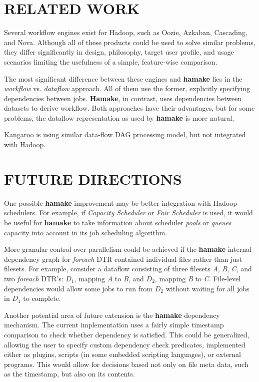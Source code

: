 \documentclass[a4paper,twoside]{article}
\begin{document}
\section{\uppercase{Related Work}}

Several workflow engines exist for Hadoop, such as Oozie\cite{ooize},
Azkaban\cite{azkaban}, Cascading\cite{cascading}, and
Nova\cite{olston2011nova}.  Although all of these products could be
used to solve similar problems, they differ significantly in design,
philosophy, target user profile, and usage scenarios limiting the
usefulness of a simple, feature-wise comparison.

The most significant difference between these engines and
\textbf{hamake} lies in the \textit{workflow} vs. \textit{dataflow}
approach. All of them use the former, explicitly specifying
dependencies between jobs. \textbf{Hamake}, in contrast, uses
dependencies between datasets to derive workflow. Both approaches have
their advantages, but for some problems, the dataflow representation
as used by \textbf{hamake} is more natural.

Kangaroo\cite{zhang2011kangaroo} is using similar data-flow DAG
processing model, but not integrated with Hadoop.

\section{\uppercase{Future Directions}}

One possible \textbf{hamake} improvement may be better integration with Hadoop schedulers. For example, if \textit{Capacity Scheduler} or \textit{Fair Scheduler} is used, it would be useful for \textbf{hamake} to take information about scheduler \textit{pools} or \textit{queues} capacity into account in its job scheduling algorithm.

More granular control over parallelism could be achieved if the
\textbf{hamake} internal dependency graph for \emph{foreach} DTR
contained individual files rather than just filesets. For example, consider a
dataflow consisting of three filesets \textit{A}, \textit{B},
\textit{C}, and two \emph{foreach} DTR's: \textit{$D_1$}, mapping
\textit{A} to \textit{B}, and \textit{$D_2$}, mapping \textit{B} to
\textit{C}. File-level dependencies would allow some jobs to run from
\textit{$D_2$} without waiting for all jobs in \textit{$D_1$} to
complete.

Another potential area of future extension is the \textbf{hamake} dependency
mechanism. The current implementation uses a fairly simple timestamp
comparison to check whether dependency is satisfied. This could be
generalized, allowing the user to specify custom dependency check
predicates, implemented either as plugins, scripts 
(in some embedded
scripting languages), or external programs. This would allow for
decisions based not only on file meta data, such as the timestamp, but also on its contents.
\end{document}
